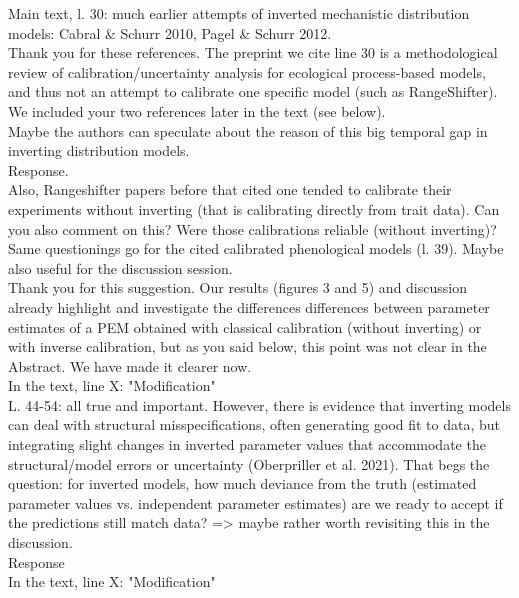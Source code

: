 \documentclass[a4paper, 11pt]{article}
\begin{document}
\noindent Main text, l. 30: much earlier attempts of inverted mechanistic distribution models:
Cabral \& Schurr 2010, Pagel \& Schurr 2012. \\
\textcolor{customblue}{Thank you for these references. The preprint we cite line 30 is a methodological review of calibration/uncertainty analysis for ecological process-based models, and thus not an attempt to calibrate one specific model (such as RangeShifter). We included your two references later in the text (see below).}\\

\noindent Maybe the authors can speculate about the reason of this big temporal gap in inverting distribution models.\\
\textcolor{customblue}{Response.}\\

\noindent Also, Rangeshifter papers before that cited one tended to calibrate their experiments without inverting (that is calibrating directly from trait data). Can you also comment on this? Were those calibrations reliable (without inverting)? Same questionings go for the cited calibrated phenological models (l. 39). Maybe also useful for the discussion session.\\
\textcolor{customblue}{Thank you for this suggestion. Our results (figures 3 and 5) and discussion already highlight and investigate the differences differences between parameter estimates of a PEM obtained with classical calibration (without inverting) or with inverse calibration, but as you said below, this point was not clear in the Abstract. We have made it clearer now.}\\
In the text, line X: \textcolor{customred}{"Modification"}\\

\noindent L. 44-54: all true and important. However, there is evidence that inverting models can deal with structural misspecifications, often generating good fit to data, but integrating slight changes in inverted parameter values that accommodate the structural/model errors or uncertainty (Oberpriller et al. 2021). That begs the question: for inverted models, how much deviance from the truth (estimated parameter values vs. independent parameter estimates) are we ready to accept if the predictions still match data? => maybe rather worth revisiting this in the discussion.\\
\textcolor{customblue}{Response}\\
In the text, line X: \textcolor{customred}{"Modification"}\\
\end{document}
